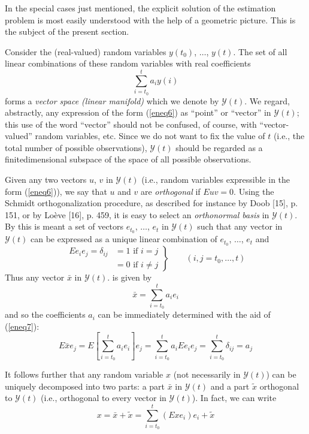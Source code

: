 \documentclass{article}
\newcommand{\manf}[1]{\mathbf{\mathcal{#1}}}
\begin{document}
In the special cases just mentioned, the explicit solution of the estimation problem is most easily understood with the help of a geometric picture. This is the subject of the present section.

Consider the (real-valued) random variables $y(t_0)$, $\dotsc$, $y(t)$. The set of all linear combinations of these random variables with real
coefficients
\begin{equation}
\label{eneq6}
\sum^t_{i=t_0}a_i y(i)
\end{equation}
forms a \emph{vector space (linear manifold)} which we denote by $\mathbf{\mathcal{Y}}(t)$. We regard, abstractly, any expression of the form (\ref{eneq6}) as “point” or “vector” in $\manf{Y}(t)$; this use of the word “vector” should not be confused, of course, with “vector-valued” random variables, etc. Since we do not want to fix the value of $t$ (i.e., the total number of possible observations), $\manf{Y}(t)$ should be regarded as a finitedimensional subspace of the space of all possible observations.

Given any two vectors $u$, $v$ in $\manf{Y}(t)$ (i.e., random variables expressible in the form (\ref{eneq6})), we say that $u$ and $v$ are \emph{orthogonal} if $Euv = 0$. Using the Schmidt orthogonalization procedure, as described for instance by Doob [15], p. 151, or by Lo\`{e}ve [16], p. 459, it is easy to select an \emph{orthonormal basis} in $\manf{Y}(t)$. By this is meant a set of vectors $e_{t_0}$, $\dotsc$, $e_t$ in $\manf{Y}(t)$ such that any vector in $\manf{Y}(t)$ can be expressed as a unique linear combination of $e_{t_0}$, $\dotsc$, $e_t$ and
\begin{equation}
\label{eneq7}
\left.\begin{aligned}
Ee_ie_j=\delta_{ij}&=1 \text{ if } i = j\\
&=0 \text{ if } i \ne j
\end{aligned}\right\}
\qquad (i,j=t_0,\dotsc,t)
\end{equation}
Thus any vector $\bar{x}$ in $\manf{Y}(t)$. is given by
\begin{equation*}
\bar{x}=\sum^t_{i=t_0}a_ie_i
\end{equation*}
and so the coefficients $a_i$ can be immediately determined with the
aid of (\ref{eneq7}):
\begin{equation}
\label{eneq8}
E\bar{x}e_j=E[\sum^t_{i=t_0}a_ie_i]e_j=\sum^t_{i=t_0}a_iEe_ie_j=\sum^t_{i=t_0}\delta_{ij}=a_j
\end{equation}

It follows further that any random variable $x$ (not necessarily in $\manf{Y}(t)$) can be uniquely decomposed into two parts: a part $\bar{x}$ in $\manf{Y}(t)$ and a part $\tilde{x}$ orthogonal to $\manf{Y}(t)$ (i.e., orthogonal to every vector in $\manf{Y}(t)$). In fact, we can write
\begin{equation}
\label{eneq9}
x=\bar{x}+\tilde{x}=\sum^t_{i=t_0}(Exe_i)e_i+\tilde{x}
\end{equation}
\end{document}
